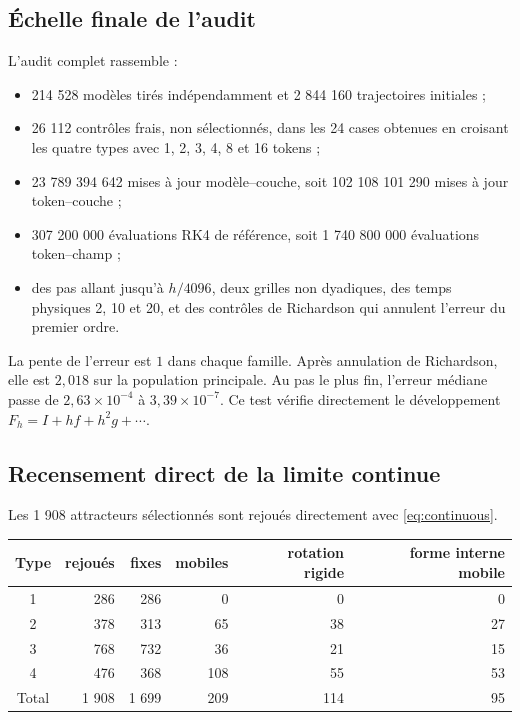 \documentclass[11pt,a4paper]{article}
\theoremstyle{definition}
\begin{document}
\subsection{Échelle finale de l'audit}

L'audit complet rassemble :

\begin{itemize}
  \item 214 528 modèles tirés indépendamment et 2 844 160 trajectoires initiales ;
  \item 26 112 contrôles frais, non sélectionnés, dans les 24 cases obtenues en croisant
  les quatre types avec 1, 2, 3, 4, 8 et 16 tokens ;
  \item 23 789 394 642 mises à jour modèle--couche, soit 102 108 101 290 mises à jour
  token--couche ;
  \item 307 200 000 évaluations RK4 de référence, soit 1 740 800 000 évaluations
  token--champ ;
  \item des pas allant jusqu'à $h/4096$, deux grilles non dyadiques, des temps physiques
  2, 10 et 20, et des contrôles de Richardson qui annulent l'erreur du premier ordre.
\end{itemize}

La pente de l'erreur est $1$ dans chaque famille. Après annulation de Richardson, elle
est $2{,}018$ sur la population principale. Au pas le plus fin, l'erreur médiane passe
de $2{,}63\times10^{-4}$ à $3{,}39\times10^{-7}$. Ce test vérifie directement le
développement $F_h=I+hf+h^2g+\cdots$.

\subsection{Recensement direct de la limite continue}

Les 1 908 attracteurs sélectionnés sont rejoués directement avec
\eqref{eq:continuous}.

\begin{center}
\begin{tabular}{crrrrr}
\toprule
Type & rejoués & fixes & mobiles & rotation rigide & forme interne mobile \\
\midrule
1 & 286 & 286 & 0 & 0 & 0 \\
2 & 378 & 313 & 65 & 38 & 27 \\
3 & 768 & 732 & 36 & 21 & 15 \\
4 & 476 & 368 & 108 & 55 & 53 \\
\midrule
Total & 1 908 & 1 699 & 209 & 114 & 95 \\
\bottomrule
\end{tabular}
\end{center}
\end{document}
